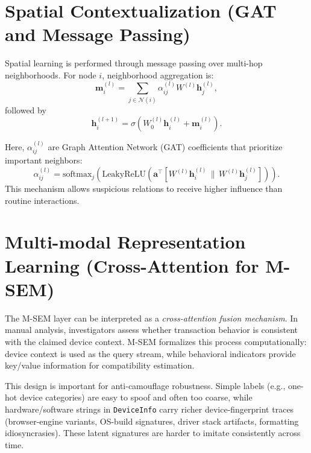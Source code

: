 \documentclass[12pt,a4paper]{report}
\begin{document}
\section{Spatial Contextualization (GAT and Message Passing)}
Spatial learning is performed through message passing over multi-hop neighborhoods. For node $i$, neighborhood aggregation is:
\begin{equation}
\mathbf{m}_i^{(l)} = \sum_{j \in \mathcal{N}(i)} \alpha_{ij}^{(l)} W^{(l)} \mathbf{h}_j^{(l)},
\end{equation}
followed by
\begin{equation}
\mathbf{h}_i^{(l+1)} = \sigma\left(W_0^{(l)}\mathbf{h}_i^{(l)} + \mathbf{m}_i^{(l)}\right).
\end{equation}

Here, $\alpha_{ij}^{(l)}$ are Graph Attention Network (GAT) coefficients that prioritize important neighbors:
\begin{equation}
\alpha_{ij}^{(l)} =
\mathrm{softmax}_j\left(
\mathrm{LeakyReLU}\left(
\mathbf{a}^{\top}
\left[W^{(l)}\mathbf{h}_i^{(l)} \,\|\, W^{(l)}\mathbf{h}_j^{(l)}\right]
\right)
\right).
\end{equation}
This mechanism allows suspicious relations to receive higher influence than routine interactions.

\section{Multi-modal Representation Learning (Cross-Attention for M-SEM)}
The M-SEM layer can be interpreted as a \emph{cross-attention fusion mechanism}. In manual analysis, investigators assess whether transaction behavior is consistent with the claimed device context. M-SEM formalizes this process computationally: device context is used as the query stream, while behavioral indicators provide key/value information for compatibility estimation.

This design is important for anti-camouflage robustness. Simple labels (e.g., one-hot device categories) are easy to spoof and often too coarse, while hardware/software strings in \texttt{DeviceInfo} carry richer device-fingerprint traces (browser-engine variants, OS-build signatures, driver stack artifacts, formatting idiosyncrasies). These latent signatures are harder to imitate consistently across time.
\end{document}
